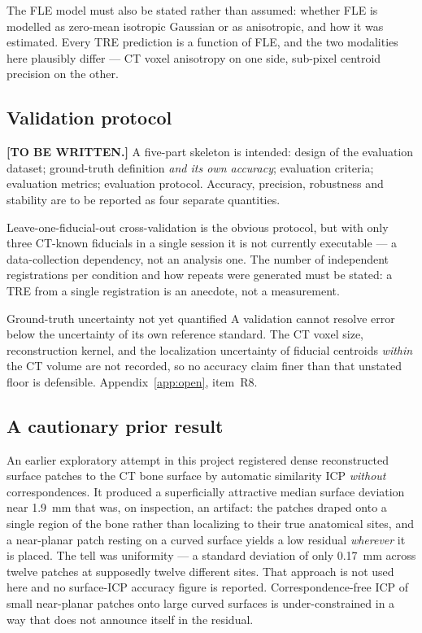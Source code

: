 \documentclass[journal,10pt]{IEEEtran}
\newcommand{\TODO}[1]{\textcolor{todoRed}{\textbf{[#1]}}}
\begin{document}
The FLE model must also be stated rather than assumed: whether FLE is modelled as
zero-mean isotropic Gaussian or as anisotropic, and how it was estimated. Every
TRE prediction is a function of FLE, and the two modalities here plausibly differ
--- CT voxel anisotropy on one side, sub-pixel centroid precision on the other.

\subsection{Validation protocol}\label{sec:regprotocol}
\TODO{TO BE WRITTEN.} A five-part skeleton is intended: design of the evaluation
dataset; ground-truth definition \emph{and its own accuracy}; evaluation
criteria; evaluation metrics; evaluation protocol. Accuracy, precision,
robustness and stability are to be reported as four separate quantities.

Leave-one-fiducial-out cross-validation is the obvious protocol, but with only
three CT-known fiducials in a single session it is not currently executable ---
a data-collection dependency, not an analysis one. The number of independent
registrations per condition and how repeats were generated must be stated: a TRE
from a single registration is an anecdote, not a measurement.

\begin{notebox}{Ground-truth uncertainty not yet quantified}
A validation cannot resolve error below the uncertainty of its own reference
standard. The CT voxel size, reconstruction kernel, and the localization
uncertainty of fiducial centroids \emph{within} the CT volume are not recorded,
so no accuracy claim finer than that unstated floor is defensible.
Appendix~\ref{app:open}, item~R8.
\end{notebox}

\subsection{A cautionary prior result}
An earlier exploratory attempt in this project registered dense reconstructed
surface patches to the CT bone surface by automatic similarity ICP \emph{without}
correspondences. It produced a superficially attractive median surface deviation
near \SI{1.9}{\milli\metre} that was, on inspection, an artifact: the
patches draped onto a single region of the bone rather than localizing to their
true anatomical sites, and a near-planar patch resting on a curved surface yields
a low residual \emph{wherever} it is placed. The tell was uniformity --- a
standard deviation of only \SI{0.17}{\milli\metre} across twelve patches at
supposedly twelve different sites. That approach is not used here and no
surface-ICP accuracy figure is reported. Correspondence-free ICP of small
near-planar patches onto large curved surfaces is under-constrained in a way that
does not announce itself in the residual.
\end{document}
